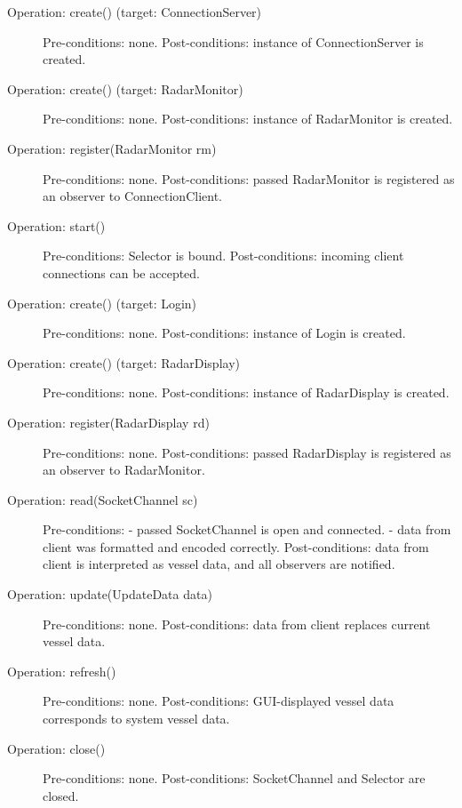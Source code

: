 \documentclass{article}
\begin{document}
\begin{description}
  \item[Operation: create() (target: ConnectionServer)] Pre-conditions: none.\newline
  Post-conditions: instance of ConnectionServer is created.
  \item[Operation: create() (target: RadarMonitor)] Pre-conditions: none.\newline
  Post-conditions: instance of RadarMonitor is created.
  \item[Operation: register(RadarMonitor rm)] Pre-conditions: none.\newline
  Post-conditions: passed RadarMonitor is registered as an observer to ConnectionClient.
  \item[Operation: start()] Pre-conditions: Selector is bound.\newline
  Post-conditions: incoming client connections can be accepted.
  \item[Operation: create() (target: Login)] Pre-conditions: none.\newline
  Post-conditions: instance of Login is created.
  \item[Operation: create() (target: RadarDisplay)] Pre-conditions: none.\newline
  Post-conditions: instance of RadarDisplay is created.
  \item[Operation: register(RadarDisplay rd)] Pre-conditions: none.\newline
  Post-conditions: passed RadarDisplay is registered as an observer to RadarMonitor.
  \item[Operation: read(SocketChannel sc)] Pre-conditions:
  - passed SocketChannel is open and connected.\newline
  - data from client was formatted and encoded correctly.\newline
  Post-conditions: data from client is interpreted as vessel data, and all observers are notified.
  \item[Operation: update(UpdateData data)] Pre-conditions: none.\newline
 Post-conditions: data from client replaces current vessel data.
  \item[Operation: refresh()] Pre-conditions: none.\newline
  Post-conditions: GUI-displayed vessel data corresponds to system vessel data.
  \item[Operation: close()] Pre-conditions: none.\newline
  Post-conditions: SocketChannel and Selector are closed.
\end{description}
\end{document}
